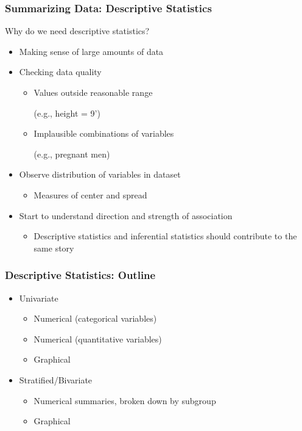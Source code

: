 \documentclass[12pt, 
hyperref={colorlinks=true, linkcolor=blue, urlcolor=cyan}]{beamer}
\begin{document}
\begin{frame}
\frametitle{Summarizing Data: Descriptive Statistics}
Why do we need descriptive statistics?\vspace{-0.2cm}
\begin{itemize}
\item Making sense of large amounts of data
\item Checking data quality
	\begin{itemize}
	\item Values outside reasonable range \begin{footnotesize} (e.g., height = 9') \end{footnotesize}
	\item Implausible combinations of variables \begin{footnotesize} (e.g., pregnant men) \end{footnotesize}
	\end{itemize}
\item Observe distribution of variables in dataset
	\begin{itemize}
	\item Measures of center and spread
	\end{itemize}
\item Start to understand direction and strength of association
	\begin{itemize}
	\item Descriptive statistics and inferential statistics should contribute to the same story
	\end{itemize}
\end{itemize}
\end{frame}

\begin{frame}
\frametitle{Descriptive Statistics: Outline}

\begin{itemize}
\item Univariate
	\begin{itemize}
	\item Numerical (categorical variables)
	\item Numerical (quantitative variables)
	\item Graphical
	\end{itemize}
\item Stratified/Bivariate
	\begin{itemize}
	\item Numerical summaries, broken down by subgroup
	\item Graphical
	\end{itemize}
\end{itemize}

\end{frame}
\end{document}
